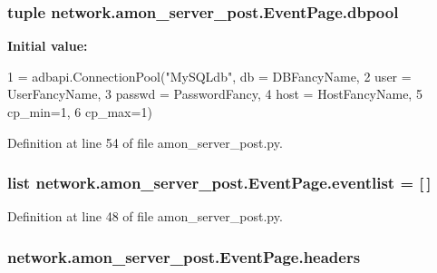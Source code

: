\hypertarget{classnetwork_1_1amon__server__post_1_1_event_page_a27945808b5c4a8cdcde134a10df4965d}{
\subsubsection[{dbpool}]{\setlength{\rightskip}{0pt plus 5cm}tuple network.\-amon\-\_\-server\-\_\-post.\-Event\-Page.\-dbpool\hspace{0.3cm}{\ttfamily [static]}}}\label{classnetwork_1_1amon__server__post_1_1_event_page_a27945808b5c4a8cdcde134a10df4965d}
{\bfseries Initial value\-:}
\begin{DoxyCode}
1 = adbapi.ConnectionPool(\textcolor{stringliteral}{"MySQLdb"}, db = DBFancyName, 
2                                             user = UserFancyName, 
3                                             passwd = PasswordFancy, 
4                                             host = HostFancyName,
5                                             cp\_min=1,
6                                             cp\_max=1)
\end{DoxyCode}


Definition at line 54 of file amon\-\_\-server\-\_\-post.\-py.

\hypertarget{classnetwork_1_1amon__server__post_1_1_event_page_a758c79966f818aa356316d87052f9c2e}{
\subsubsection[{eventlist}]{\setlength{\rightskip}{0pt plus 5cm}list network.\-amon\-\_\-server\-\_\-post.\-Event\-Page.\-eventlist = \mbox{[}$\,$\mbox{]}\hspace{0.3cm}{\ttfamily [static]}}}\label{classnetwork_1_1amon__server__post_1_1_event_page_a758c79966f818aa356316d87052f9c2e}


Definition at line 48 of file amon\-\_\-server\-\_\-post.\-py.

\hypertarget{classnetwork_1_1amon__server__post_1_1_event_page_a032c0165742082f9d0e347cbdfb50711}{
\subsubsection[{headers}]{\setlength{\rightskip}{0pt plus 5cm}network.\-amon\-\_\-server\-\_\-post.\-Event\-Page.\-headers}}\label{classnetwork_1_1amon__server__post_1_1_event_page_a032c0165742082f9d0e347cbdfb50711}


